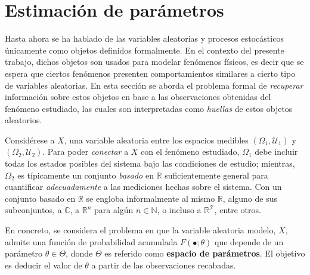 \documentclass[12pt,letterpaper,draft]{book}
\newtheorem{definicion}{Definición}[chapter]
\newcommand{\R}{\mathbb{R}}
\newcommand{\C}{\mathbb{C}}
\newcommand{\N}{\mathbb{N}}
\begin{document}

\section{Estimación de parámetros}

Hasta ahora se ha hablado de las variables aleatorias y procesos estocásticos únicamente como objetos definidos formalmente.
%
En el contexto del presente trabajo, dichos objetos son usados para modelar fenómenos físicos, es decir que se espera que ciertos fenómenos presenten comportamientos similares a cierto tipo de variables aleatorias.
%
%
En esta sección se aborda el problema formal de \textit{recuperar} información sobre estos objetos en base a las observaciones obtenidas del fenómeno estudiado, las cuales son interpretadas como \textit{huellas} de estos objetos aleatorios.


Considérese a $X$, una variable aleatoria entre los espacios medibles $(\Omega_1,\mathcal{U}_1)$ y $(\Omega_2,\mathcal{U}_2)$. 
%
Para poder \textit{conectar} a $X$ con el fenómeno estudiado, $\Omega_1$ debe incluir todas los estados posibles del sistema bajo las condiciones de estudio; mientras, $\Omega_2$ es típicamente un conjunto \textit{basado} en $\R$ suficientemente general para cuantificar \textit{adecuadamente} a las mediciones hechas sobre el sistema.
%
Con un conjunto basado en $\R$ se engloba informalmente al mismo $\R$, alguno de sus subconjuntos, a $\C$, a $\R^n$ para algún $n\in \N$, o incluso a $\R^\mathcal{T}$, entre otros.

En concreto, se considera el problema en que la variable aleatoria modelo, $X$, admite una función de probabilidad acumulada $F(\bullet; \theta)$ que depende de un parámetro $\theta \in \Theta$, donde $\Theta$ es referido como \textbf{espacio de parámetros}.
%
El objetivo es deducir el valor de $\theta$ a partir de las observaciones recabadas.
\end{document}
